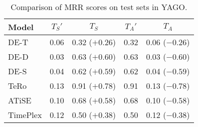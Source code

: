 \begin{table*}[htb]
\centering
\begin{minipage}{\fullwidthcaption}
\centering
\caption{Comparison of MRR scores on test sets in YAGO.}
\vspace{-3mm}

\begin{tabular}{l|cc|cc}\hline
Model & $T_S'$ & $T_S$ & $T_A'$ & $T_A$ \\ \hline
DE-T & 0.06 & 0.32 (\textcolor{textgreen}{$+0.26$}) & 0.32 & 0.06 (\textcolor{textred}{$-0.26$}) \\ 
DE-D & 0.03 & 0.63 (\textcolor{textgreen}{$+0.60$}) & 0.63 & 0.03 (\textcolor{textred}{$-0.60$}) \\ 
DE-S & 0.04 & 0.62 (\textcolor{textgreen}{$+0.59$}) & 0.62 & 0.04 (\textcolor{textred}{$-0.59$}) \\ 
TeRo & 0.13 & 0.91 (\textcolor{textgreen}{$+0.78$}) & 0.91 & 0.13 (\textcolor{textred}{$-0.78$}) \\ 
ATiSE & 0.10 & 0.68 (\textcolor{textgreen}{$+0.58$}) & 0.68 & 0.10 (\textcolor{textred}{$-0.58$}) \\ 
TimePlex & 0.12 & 0.50 (\textcolor{textgreen}{$+0.38$}) & 0.50 & 0.12 (\textcolor{textred}{$-0.38$}) \\ 
 \hline
\end{tabular}

\label{tab:relation_properties_yago11k_comparison}
\end{minipage}
\end{table*}

